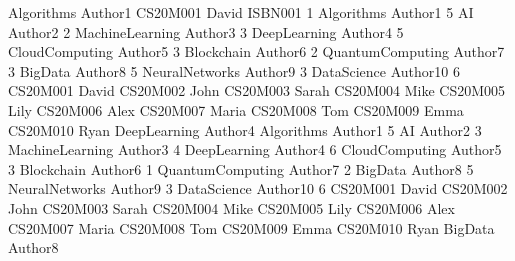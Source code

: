 Algorithms Author1
CS20M001 David ISBN001 1
Algorithms Author1 5
AI Author2 2
MachineLearning Author3 3
DeepLearning Author4 5
CloudComputing Author5 3
Blockchain Author6 2
QuantumComputing Author7 3
BigData Author8 5
NeuralNetworks Author9 3
DataScience Author10 6
CS20M001 David
CS20M002 John
CS20M003 Sarah
CS20M004 Mike
CS20M005 Lily
CS20M006 Alex
CS20M007 Maria
CS20M008 Tom
CS20M009 Emma
CS20M010 Ryan
DeepLearning Author4
Algorithms Author1 5
AI Author2 3
MachineLearning Author3 4
DeepLearning Author4 6
CloudComputing Author5 3
Blockchain Author6 1
QuantumComputing Author7 2
BigData Author8 5
NeuralNetworks Author9 3
DataScience Author10 6
CS20M001 David
CS20M002 John
CS20M003 Sarah
CS20M004 Mike
CS20M005 Lily
CS20M006 Alex
CS20M007 Maria
CS20M008 Tom
CS20M009 Emma
CS20M010 Ryan
BigData Author8